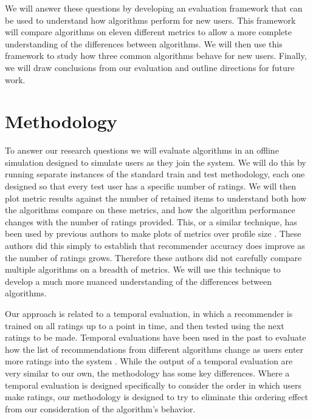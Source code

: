 \documentclass[letterpaper]{sig-alternate}
\begin{document}
  We will answer these questions by developing an evaluation framework that can be used to understand how algorithms perform for new users.
  This framework will compare algorithms on eleven different metrics to allow a more complete understanding of the differences between algorithms.
  We will then use this framework to study how three common algorithms behave for new users.
  Finally, we will draw conclusions from our evaluation and outline directions for future work.

\section{Methodology}
\label{sec:methodology}

  To answer our research questions we will evaluate algorithms in an offline simulation designed to simulate users as they join the system.
  We will do this by running separate instances of the standard train and test methodology, each one designed so that every test user has a specific  number of ratings.
  We will then plot metric results against the number of retained items to understand both how the algorithms compare on these metrics, and how the algorithm performance changes with the number of ratings provided.
  This, or a similar technique, has been used by previous authors to make plots of metrics over profile size \cite{DrennerInitialExperiance, TenIsEnough, AdaptiveBootstrap}.
  These authors did this simply to establish that recommender accuracy does improve as the number of ratings grows.
  Therefore these authors did not carefully compare multiple algorithms on a breadth of metrics.
  We will use this technique to develop a much more nuanced understanding of the differences between algorithms.

  Our approach is related to a temporal evaluation, in which a recommender is trained on all ratings up to a point in time, and then tested using the next ratings to be made.
  Temporal evaluations have been used in the past to evaluate how the list of recommendations from different algorithms change as users enter more ratings into the system \cite{LathiaTemporal}.
  While the output of a temporal evaluation are very similar to our own, the methodology has some key differences.
  Where a temporal evaluation is designed specifically to consider the order in which users make ratings, our methodology is designed to try to eliminate this ordering effect from our consideration of the algorithm's behavior.
\end{document}
